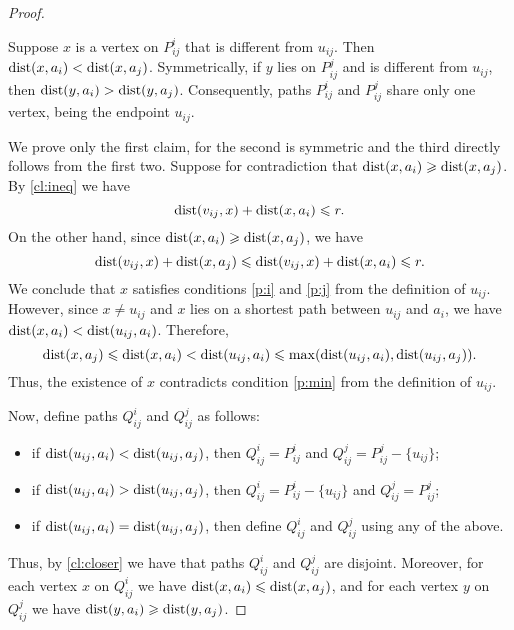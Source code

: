 \begin{proof}
\begin{claim}\label{cl:closer}
Suppose $x$ is a vertex on $P^i_{ij}$ that is different from $u_{ij}$. Then $\mathrm{dist}(x,a_i)<\mathrm{dist}(x,a_j)$.
Symmetrically, if $y$ lies on $P^j_{ij}$ and is different from $u_{ij}$, then $\mathrm{dist}(y,a_i)>\mathrm{dist}(y,a_j)$.
Consequently, paths $P^i_{ij}$ and $P^j_{ij}$ share only one vertex, being the endpoint $u_{ij}$.
\end{claim}
\begin{clproof}
We prove only the first claim, for the second is symmetric and the third directly follows from the first two.
Suppose for contradiction that $\mathrm{dist}(x,a_i)\geqslant \mathrm{dist}(x,a_j)$.
By \cref{cl:ineq} we have 
$$\mathrm{dist}(v_{ij},x)+\mathrm{dist}(x,a_i)\leqslant r.$$
On the other hand, since $\mathrm{dist}(x,a_i)\geqslant \mathrm{dist}(x,a_j)$, we have
$$\mathrm{dist}(v_{ij},x)+\mathrm{dist}(x,a_j)\leqslant\mathrm{dist}(v_{ij},x)+\mathrm{dist}(x,a_i)\leqslant r.$$
We conclude that $x$ satisfies conditions \eqref{p:i} and \eqref{p:j} from the definition of $u_{ij}$.
However, since $x\neq u_{ij}$ and $x$ lies on a shortest path between $u_{ij}$ and $a_i$, we have $\mathrm{dist}(x,a_i)<\mathrm{dist}(u_{ij},a_i)$.
Therefore,
$$\mathrm{dist}(x,a_j)\leqslant \mathrm{dist}(x,a_i)<\mathrm{dist}(u_{ij},a_i)\leqslant \max(\mathrm{dist}(u_{ij},a_i),\mathrm{dist}(u_{ij},a_j)).$$
Thus, the existence of $x$ contradicts condition \eqref{p:min} from the definition of $u_{ij}$.
\end{clproof}

Now, define paths $Q^i_{ij}$ and $Q^j_{ij}$ as follows:
\begin{itemize}
\item if $\mathrm{dist}(u_{ij},a_i)<\mathrm{dist}(u_{ij},a_j)$, then $Q^{i}_{ij}=P^{i}_{ij}$ and $Q^{j}_{ij}=P^{j}_{ij} - \{u_{ij}\}$;
\item if $\mathrm{dist}(u_{ij},a_i)>\mathrm{dist}(u_{ij},a_j)$, then $Q^{i}_{ij}=P^{i}_{ij} - \{u_{ij}\}$ and $Q^{j}_{ij}=P^{j}_{ij}$;
\item if $\mathrm{dist}(u_{ij},a_i)=\mathrm{dist}(u_{ij},a_j)$, then define $Q^i_{ij}$ and $Q^j_{ij}$ using any of the above.
\end{itemize}
Thus, by \cref{cl:closer} we have that paths $Q^{i}_{ij}$ and $Q^{j}_{ij}$ are disjoint. Moreover, for each vertex $x$ on $Q^{i}_{ij}$ we have $\mathrm{dist}(x,a_i)\leqslant \mathrm{dist}(x,a_j)$, and for each
vertex $y$ on $Q^{j}_{ij}$ we have $\mathrm{dist}(y,a_i)\geqslant \mathrm{dist}(y,a_j)$.


\end{proof}
